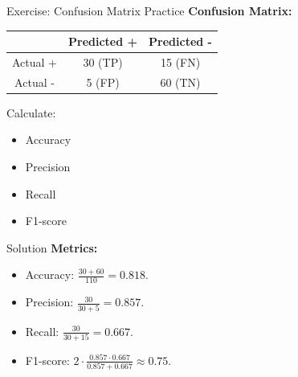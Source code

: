 \documentclass{beamer}
\begin{document}
\begin{frame}{Exercise: Confusion Matrix Practice}
  \textbf{Confusion Matrix:}
  \begin{table}[h]
    \centering
    \begin{tabular}{|c|c|c|}
      \hline
      & Predicted + & Predicted - \\
      \hline
      Actual + & 30 (TP) & 15 (FN) \\
      \hline
      Actual - & 5 (FP) & 60 (TN) \\
      \hline
    \end{tabular}
  \end{table}
  \vspace{0.5em}
  Calculate:
  \begin{itemize}
    \item Accuracy
    \item Precision
    \item Recall
    \item F1-score
  \end{itemize}
\end{frame}

\begin{frame}{Solution}
  \textbf{Metrics:}
  \begin{itemize}
    \item Accuracy: \( \frac{30 + 60}{110} = 0.818 \).
    \item Precision: \( \frac{30}{30 + 5} = 0.857 \).
    \item Recall: \( \frac{30}{30 + 15} = 0.667 \).
    \item F1-score: \( 2 \cdot \frac{0.857 \cdot 0.667}{0.857 + 0.667} \approx 0.75 \).
  \end{itemize}
\end{frame}
\end{document}
